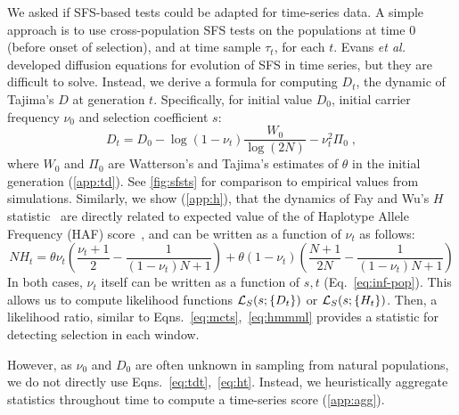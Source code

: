 We asked if SFS-based tests could be adapted for time-series data. A
simple approach is to use cross-population SFS tests on the
populations at time $0$ (before onset of selection), and at time
sample $\tau_t$, for each $t$. Evans \emph{et al.}~\cite{evans2007non} developed
diffusion equations for evolution of SFS in time series, but they are
difficult to solve. Instead, we derive a formula for computing $D_t$,
the dynamic of Tajima's $D$ at generation $t$. 
Specifically, for
initial value $D_0$, initial carrier frequency $\nu_0$ and 
selection coefficient $s$:
\begin{equation}
  D_t=D_0-\log(1-\nu_t) \frac{W_0}{\log(2N)} -\nu_t^2 \Pi_0\;,
  \label{eq:tdt}    
\end{equation}
where $W_0$ and $\Pi_0$ are Watterson's and Tajima's estimates of
$\theta$ in the initial generation (\ref{app:td}).  See
\ref{fig:sfsts} for comparison to empirical values 
from
simulations. Similarly, we show (\ref{app:h}), that the
dynamics of Fay and Wu's $H$ statistic~\cite{fay2000hitchhiking} are
directly related to expected value of the of Haplotype Allele
Frequency (HAF) score~\cite{ronen2015predicting}, and can be written
as a function of $\nu_t$ as follows:
\begin{equation}
  NH_t= \theta \nu_t \left(\frac{\nu_t+1}{2} -
    \frac{1}{(1-\nu_t)N+1}\right) + \theta
  (1-\nu_t)\left(\frac{N+1}{2N}-\frac{1}{(1-\nu_t)N+1}\right)
  \label{eq:ht}
\end{equation}	
In both cases, $\nu_t$ itself can be written as a function of $s,t$
(Eq.~\ref{eq:inf-pop}). This allows us to compute 
likelihood
functions ${\cal L}_S(s; \{D_t\})$ or ${\cal L}_S(s; \{H_t\})$. Then, a
likelihood ratio, similar to Eqns.~\ref{eq:mcts},~\ref{eq:hmmml}
provides a statistic for detecting selection in each window. 

However, as $\nu_0$ and $D_0$ are often unknown in sampling from
natural populations, we do not directly use
Eqns.~\ref{eq:tdt},~\ref{eq:ht}. Instead, we heuristically aggregate
statistics throughout time to compute a time-series score
(\ref{app:agg}).


		


